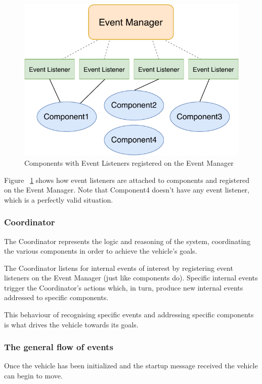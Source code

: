 \documentclass{memoir}
\begin{document}
\begin{figure}
	\centering
	\includegraphics[width=0.7\linewidth]{implementation_details/components_event_listeners.pdf}
	\caption{Components with Event Listeners registered on the Event Manager}
	\label{fig:component-event-listeners}
\end{figure}


Figure ~\ref{fig:component-event-listeners} shows how event listeners are attached to components and registered on the Event Manager.
Note that Component4 doesn't have any event listener, which is a perfectly valid situation.

\subsubsection{Coordinator}

The Coordinator represents the logic and reasoning of the system, coordinating the various components in order to achieve the vehicle’s goals.

The Coordinator listens for internal events of interest by registering event listeners on the Event Manager (just like components do).
Specific internal events trigger the Coordinator's actions which, in turn, produce new internal events addressed to specific components. 

This behaviour of recognising specific events and addressing specific components is what drives the vehicle towards its goals.

\subsubsection{The general flow of events}

Once the vehicle has been initialized and the startup message received the vehicle can begin to move. 
\\
\end{document}
